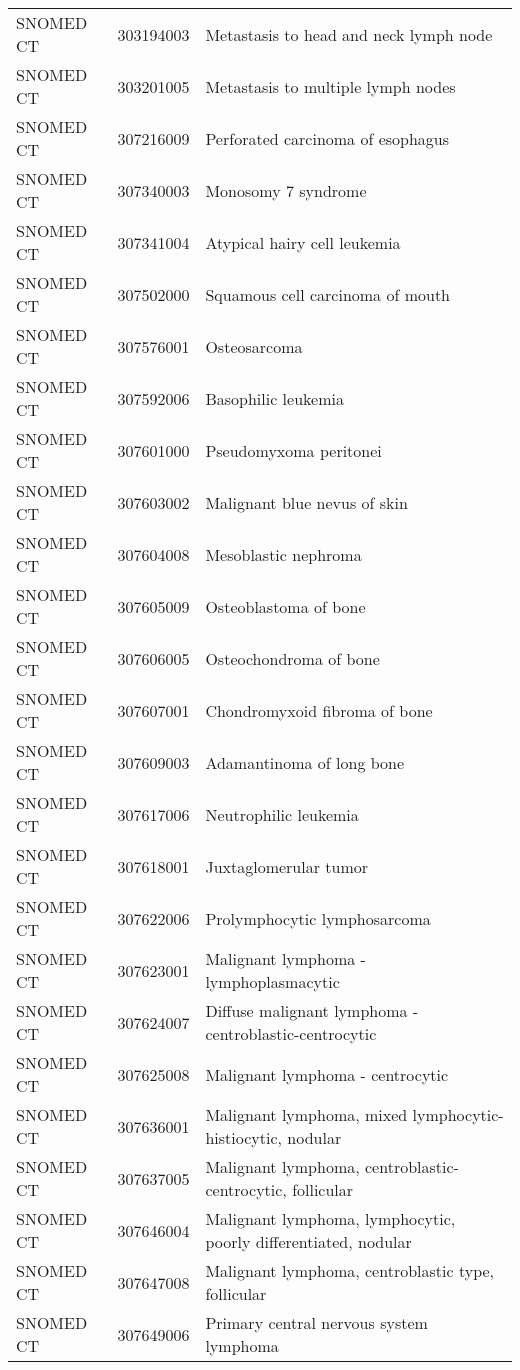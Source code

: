 \begin{longtable}{p{}p{}p{}}
  SNOMED CT & 303194003 & Metastasis to head and neck lymph node \\ 
  SNOMED CT & 303201005 & Metastasis to multiple lymph nodes \\ 
  SNOMED CT & 307216009 & Perforated carcinoma of esophagus \\ 
  SNOMED CT & 307340003 & Monosomy 7 syndrome \\ 
  SNOMED CT & 307341004 & Atypical hairy cell leukemia \\ 
  SNOMED CT & 307502000 & Squamous cell carcinoma of mouth \\ 
  SNOMED CT & 307576001 & Osteosarcoma \\ 
  SNOMED CT & 307592006 & Basophilic leukemia \\ 
  SNOMED CT & 307601000 & Pseudomyxoma peritonei \\ 
  SNOMED CT & 307603002 & Malignant blue nevus of skin \\ 
  SNOMED CT & 307604008 & Mesoblastic nephroma \\ 
  SNOMED CT & 307605009 & Osteoblastoma of bone \\ 
  SNOMED CT & 307606005 & Osteochondroma of bone \\ 
  SNOMED CT & 307607001 & Chondromyxoid fibroma of bone \\ 
  SNOMED CT & 307609003 & Adamantinoma of long bone \\ 
  SNOMED CT & 307617006 & Neutrophilic leukemia \\ 
  SNOMED CT & 307618001 & Juxtaglomerular tumor \\ 
  SNOMED CT & 307622006 & Prolymphocytic lymphosarcoma \\ 
  SNOMED CT & 307623001 & Malignant lymphoma - lymphoplasmacytic \\ 
  SNOMED CT & 307624007 & Diffuse malignant lymphoma - centroblastic-centrocytic \\ 
  SNOMED CT & 307625008 & Malignant lymphoma - centrocytic \\ 
  SNOMED CT & 307636001 & Malignant lymphoma, mixed lymphocytic-histiocytic, nodular \\ 
  SNOMED CT & 307637005 & Malignant lymphoma, centroblastic-centrocytic, follicular \\ 
  SNOMED CT & 307646004 & Malignant lymphoma, lymphocytic, poorly differentiated, nodular \\ 
  SNOMED CT & 307647008 & Malignant lymphoma, centroblastic type, follicular \\ 
  SNOMED CT & 307649006 & Primary central nervous system lymphoma \\ 

\end{longtable}
